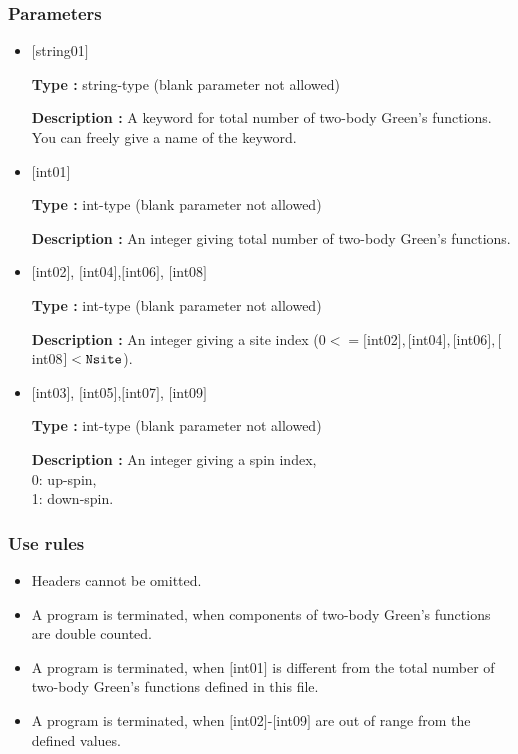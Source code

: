 \subsubsection{Parameters}
 \begin{itemize}
    \item  $[$string01$]$
   
    {\bf Type :} string-type (blank parameter not allowed)

   {\bf Description :} A keyword for total number of two-body Green's functions. You can freely give a name of the keyword.

   \item  $[$int01$]$
   
    {\bf Type :} int-type (blank parameter not allowed)

   {\bf Description :}  An integer giving total number of two-body Green's functions.


  \item  $[$int02$]$, $[$int04$]$,$[$int06$]$, $[$int08$]$

 {\bf Type :} int-type (blank parameter not allowed)

{\bf Description :} An integer giving a site index ($0<= [$int02$], [$int04$], [$int06$], [$int08$]<\verb|Nsite|$).
 
  \item  $[$int03$]$, $[$int05$]$,$[$int07$]$, $[$int09$]$

 {\bf Type :} int-type (blank parameter not allowed)

{\bf Description :} 
An integer giving a spin index,\\
0: up-spin,\\
1: down-spin.

\end{itemize}

\subsubsection{Use rules}
\begin{itemize}
\item Headers cannot be omitted. 
\item A program is terminated, when components of two-body Green's functions are double counted.
\item A program is terminated, when $[$int01$]$ is different from the total number of two-body Green's functions defined in this file.
\item A program is terminated, when $[$int02$]$-$[$int09$]$ are out of range from the defined values.
\end{itemize}

